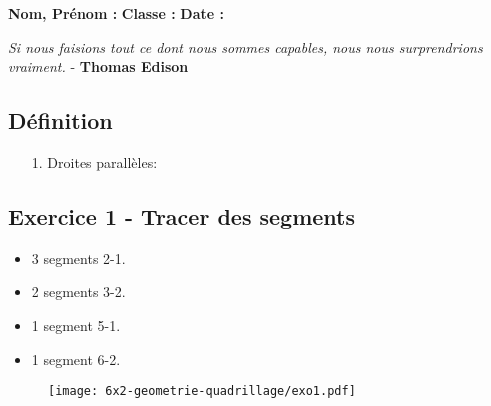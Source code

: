 



\textbf{Nom, Prénom :} \hspace{8cm} \textbf{Classe :} \hspace{3cm} \textbf{Date :}\\
\vspace{-0.8cm}
\begin{center}
  \textit{Si nous faisions tout ce dont nous sommes capables, nous nous surprendrions vraiment.}  - \textbf{Thomas Edison}
\end{center}
\vspace{-0.8cm}

\subsection*{Définition}
  \begin{enumerate}
    \item[1.] Droites parallèles: \dotfill \\
    \Pointilles[1]
  \end{enumerate}

\begin{minipage}[t]{0.25\textwidth}
  \subsection*{Exercice 1 - Tracer des segments}
  \begin{itemize}
  \item 3 segments 2-1.
  \item 2 segments 3-2.
  \item 1 segment 5-1.
  \item 1 segment 6-2.
\end{itemize}
\end{minipage}
\begin{minipage}[t]{0.75\textwidth}
\begin{figure}[H]
  \centering
  \texttt{[image: 6x2-geometrie-quadrillage/exo1.pdf]}
\end{figure}
\end{minipage}

